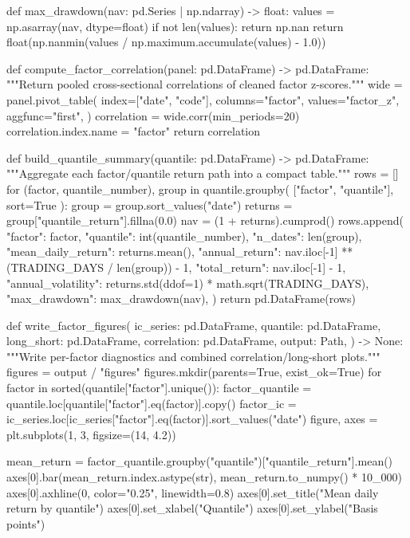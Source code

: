 \documentclass[UTF8,a4paper,fontset=fandol]{ctexart}
\begin{document}
\begin{ProjectCode}
{def max_drawdown(nav: pd.Series | np.ndarray) -> float:
    values = np.asarray(nav, dtype=float)
    if not len(values):
        return np.nan
    return float(np.nanmin(values / np.maximum.accumulate(values) - 1.0))


def compute_factor_correlation(panel: pd.DataFrame) -> pd.DataFrame:
    """Return pooled cross-sectional correlations of cleaned factor z-scores."""
    wide = panel.pivot_table(
        index=["date", "code"],
        columns="factor",
        values="factor_z",
        aggfunc="first",
    )
    correlation = wide.corr(min_periods=20)
    correlation.index.name = "factor"
    return correlation


def build_quantile_summary(quantile: pd.DataFrame) -> pd.DataFrame:
    """Aggregate each factor/quantile return path into a compact table."""
    rows = []
    for (factor, quantile_number), group in quantile.groupby(
        ["factor", "quantile"], sort=True
    ):
        group = group.sort_values("date")
        returns = group["quantile_return"].fillna(0.0)
        nav = (1 + returns).cumprod()
        rows.append({
            "factor": factor,
            "quantile": int(quantile_number),
            "n_dates": len(group),
            "mean_daily_return": returns.mean(),
            "annual_return": nav.iloc[-1] ** (TRADING_DAYS / len(group)) - 1,
            "total_return": nav.iloc[-1] - 1,
            "annual_volatility": returns.std(ddof=1) * math.sqrt(TRADING_DAYS),
            "max_drawdown": max_drawdown(nav),
        })
    return pd.DataFrame(rows)


def write_factor_figures(
    ic_series: pd.DataFrame,
    quantile: pd.DataFrame,
    long_short: pd.DataFrame,
    correlation: pd.DataFrame,
    output: Path,
) -> None:
    """Write per-factor diagnostics and combined correlation/long-short plots."""
    figures = output / "figures"
    figures.mkdir(parents=True, exist_ok=True)
    for factor in sorted(quantile["factor"].unique()):
        factor_quantile = quantile.loc[quantile["factor"].eq(factor)].copy()
        factor_ic = ic_series.loc[ic_series["factor"].eq(factor)].sort_values("date")
        figure, axes = plt.subplots(1, 3, figsize=(14, 4.2))

        mean_return = factor_quantile.groupby("quantile")["quantile_return"].mean()
        axes[0].bar(mean_return.index.astype(str), mean_return.to_numpy() * 10_000)
        axes[0].axhline(0, color="0.25", linewidth=0.8)
        axes[0].set_title("Mean daily return by quantile")
        axes[0].set_xlabel("Quantile")
        axes[0].set_ylabel("Basis points")

}
\end{ProjectCode}
\end{document}

